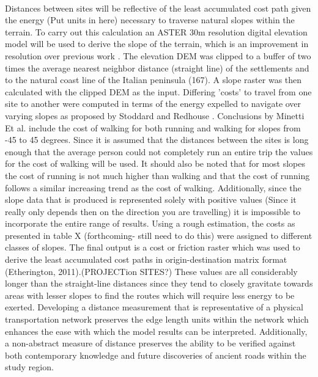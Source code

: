 \documentclass[12pt,a4paper]{thesis}
\begin{document}
\paragraph{}	
Distances between sites will be reflective of the least accumulated cost path given the energy (Put units in here) necessary to traverse natural slopes within the terrain. To carry out this calculation an ASTER 30m resolution digital elevation model will be used to derive the slope of the terrain, which is an improvement in resolution over previous work \citep[165]{StoRed11}. The elevation DEM was clipped to a buffer of two times the average nearest neighbor distance (straight line) of the settlements and to the natural coast line of the Italian peninsula (167). A slope raster was then calculated with the clipped DEM as the input. Differing 'costs' to travel from one site to another were computed in terms of the energy expelled to navigate over varying slopes \citep{Min02} as proposed by Stoddard and Redhouse \citeyearpar{StoRed11}. Conclusions by Minetti Et al. include the cost of walking for both running and walking for slopes from -45 to 45 degrees. Since it is assumed that the distances between the sites is long enough that the average person could not completely run an entire trip the values for the cost of walking will be used. It should also be noted that for most slopes the cost of running is not much higher than walking and that the cost of running follows a similar increasing trend as the cost of walking. Additionally, since the slope data that is produced is represented solely with positive values (Since it really only depends then on the direction you are travelling) it is impossible to incorporate the entire range of results. Using a rough estimation, the costs as presented in table X (forthcoming- still need to do this) were assigned to different classes of slopes. The final output is a cost or friction raster which was used to derive the least accumulated cost paths in origin-destination matrix format (Etherington, 2011).(PROJECTion SITES?) These values are all considerably longer than the straight-line distances since they tend to closely gravitate towards areas with lesser slopes to find the routes which will require less energy to be exerted. Developing a distance measurement that is representative of a physical transportation network preserves the edge length units within the network which enhances the ease with which the model results can be interpreted. Additionally, a non-abstract measure of distance preserves the ability to be verified against both contemporary knowledge and future discoveries of ancient roads within the study region.
\end{document}
